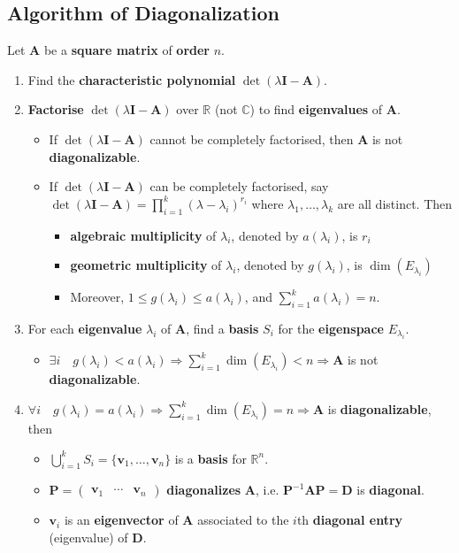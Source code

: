 \documentclass[../ma2001_notes.tex]{subfiles}
\begin{document}
\subsection{Algorithm of Diagonalization}
Let \(\bm{A}\) be a \textbf{square matrix} of \textbf{order} \(n\).
\begin{enumerate}
	\item Find the \textbf{characteristic polynomial} \(\det(\lambda\bm{I}-\bm{A})\).
	\item\textbf{Factorise} \(\det(\lambda\bm{I}-\bm{A})\) over \(\mathbb{R}\) (not \(\mathbb{C}\)) to find \textbf{eigenvalues} of \(\bm{A}\).
	\begin{itemize}
		\item If \(\det(\lambda\bm{I}-\bm{A})\) cannot be completely factorised, then \(\bm{A}\) is not \textbf{diagonalizable}.
		\item If \(\det(\lambda\bm{I}-\bm{A})\) can be completely factorised, say \(\det(\lambda\bm{I}-\bm{A})=\prod\limits_{i=1}^k(\lambda-\lambda_i)^{r_i}\) where \(\lambda_1,\ldots,\lambda_k\) are all distinct. Then
		\begin{itemize}
			\item\textbf{algebraic multiplicity} of \(\lambda_i\), denoted by \(a(\lambda_i)\), is \(r_i\)
			\item\textbf{geometric multiplicity} of \(\lambda_i\), denoted by \(g(\lambda_i)\), is \(\dim(E_{\lambda_i})\)
			\item Moreover, \(1\leq g(\lambda_i)\leq a(\lambda_i)\), and \(\sum\limits_{i=1}^ka(\lambda_i)=n\).
		\end{itemize}
	\end{itemize}
	\item For each \textbf{eigenvalue} \(\lambda_i\) of \(\bm{A}\), find a \textbf{basis} \(S_i\) for the \textbf{eigenspace} \(E_{\lambda_i}\).
	\begin{itemize}
		\item\(\exists i\quad g(\lambda_i)<a(\lambda_i)\Rightarrow\sum\limits_{i=1}^k\dim(E_{\lambda_i})<n\Rightarrow\bm{A}\) is not \textbf{diagonalizable}.
	\end{itemize}
	\item\(\forall i\quad g(\lambda_i)=a(\lambda_i)\Rightarrow\sum\limits_{i=1}^k\dim(E_{\lambda_i})=n\Rightarrow\bm{A}\) is \textbf{diagonalizable}, then
	\begin{itemize}
		\item\(\bigcup\limits_{i=1}^kS_i=\{\bm{v}_1,\ldots,\bm{v}_n\}\) is a \textbf{basis} for \(\mathbb{R}^n\).
		\item\(\bm{P}=\begin{pmatrix}
			\bm{v}_1 & \cdots & \bm{v}_n
		\end{pmatrix}\) \textbf{diagonalizes} \(\bm{A}\), i.e. \(\bm{P}^{-1}\bm{AP}=\bm{D}\) is \textbf{diagonal}.
		\item\(\bm{v}_i\) is an \textbf{eigenvector} of \(\bm{A}\) associated to the \(i\)th \textbf{diagonal entry} (eigenvalue) of \(\bm{D}\).
	\end{itemize}
\end{enumerate}
\end{document}
